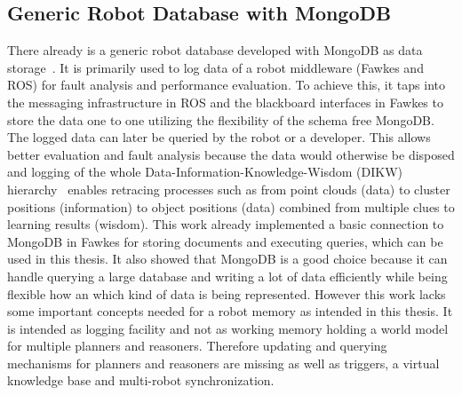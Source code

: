 \documentclass[a4paper,11pt]{article}
\begin{document}
\subsection{Generic Robot Database with MongoDB}
\label{sec:mongo-logging}
There already is a generic robot database developed with MongoDB as
data storage~\cite{RoboDB}. It is primarily used to log data of a
robot middleware (Fawkes and ROS) for fault analysis and performance
evaluation. To achieve this, it taps into the messaging infrastructure
in ROS and the blackboard interfaces in Fawkes to store the data one
to one utilizing the flexibility of the schema free MongoDB. The
logged data can later be queried by the robot or a developer. This
allows better evaluation and fault analysis because the data would
otherwise be disposed and logging of the whole
Data-Information-Knowledge-Wisdom (DIKW) hierarchy~\cite{DIKW} enables
retracing processes such as from point clouds (data) to cluster
positions (information) to object positions (data) combined from
multiple clues to learning results (wisdom). This work already
implemented a basic connection to MongoDB in Fawkes for storing
documents and executing queries, which can be used in this thesis. It
also showed that MongoDB is a good choice because it can handle
querying a large database and writing a lot of data efficiently while
being flexible how an which kind of data is being represented.
However this work lacks some important concepts needed for a robot
memory as intended in this thesis. It is intended as logging facility
and not as working memory holding a world model for multiple planners
and reasoners. Therefore updating and querying mechanisms for planners
and reasoners are missing as well as triggers, a virtual knowledge
base and multi-robot synchronization.
\end{document}
